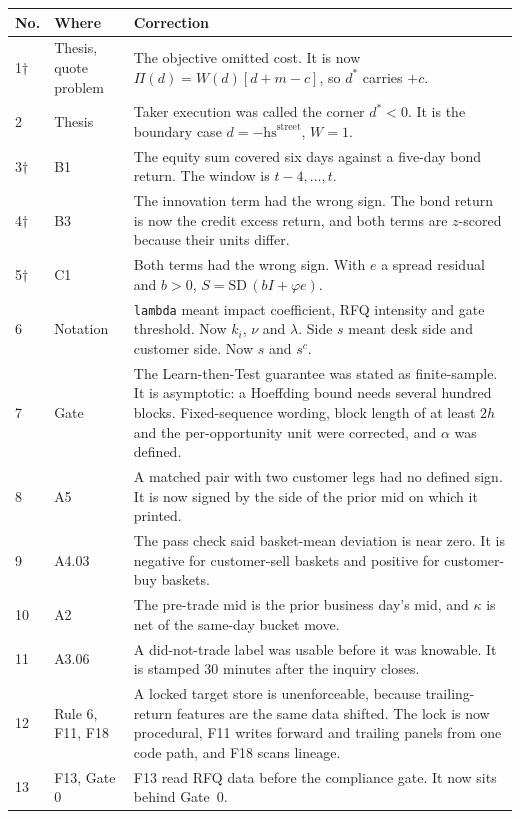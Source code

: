 \documentclass[11pt,letterpaper]{article}
\newcommand{\code}[1]{\texttt{#1}}
\newcommand{\hs}{\mathrm{hs}}             %
\newcommand{\SD}{\mathrm{SD}}             %
\begin{document}
{\small
\begin{longtable}{@{}p{}p{}p{}@{}}
\toprule
No. & Where & Correction \\
\midrule
\endhead
1$\dagger$ & Thesis, quote problem & The objective omitted cost. It is now $\Pi(d)=W(d)[d+m-c]$, so $d^{*}$ carries $+c$. \\
2 & Thesis & Taker execution was called the corner $d^{*}<0$. It is the boundary case $d=-\hs^{\mathrm{street}}$, $W=1$. \\
3$\dagger$ & B1 & The equity sum covered six days against a five-day bond return. The window is $t-4,\dots,t$. \\
4$\dagger$ & B3 & The innovation term had the wrong sign. The bond return is now the credit excess return, and both terms are $z$-scored because their units differ. \\
5$\dagger$ & C1 & Both terms had the wrong sign. With $e$ a spread residual and $b>0$, $S=\SD\,(bI+\varphi e)$. \\
6 & Notation & \code{lambda} meant impact coefficient, RFQ intensity and gate threshold. Now $k_i$, $\nu$ and $\lambda$. Side $s$ meant desk side and customer side. Now $s$ and $s^{c}$. \\
7 & Gate & The Learn-then-Test guarantee was stated as finite-sample. It is asymptotic: a Hoeffding bound needs several hundred blocks. Fixed-sequence wording, block length of at least $2h$ and the per-opportunity unit were corrected, and $\alpha$ was defined. \\
8 & A5 & A matched pair with two customer legs had no defined sign. It is now signed by the side of the prior mid on which it printed. \\
9 & A4.03 & The pass check said basket-mean deviation is near zero. It is negative for customer-sell baskets and positive for customer-buy baskets. \\
10 & A2 & The pre-trade mid is the prior business day's mid, and $\kappa$ is net of the same-day bucket move. \\
11 & A3.06 & A did-not-trade label was usable before it was knowable. It is stamped 30 minutes after the inquiry closes. \\
12 & Rule 6, F11, F18 & A locked target store is unenforceable, because trailing-return features are the same data shifted. The lock is now procedural, F11 writes forward and trailing panels from one code path, and F18 scans lineage. \\
13 & F13, Gate 0 & F13 read RFQ data before the compliance gate. It now sits behind Gate~0. \\

\end{longtable}}
\end{document}

